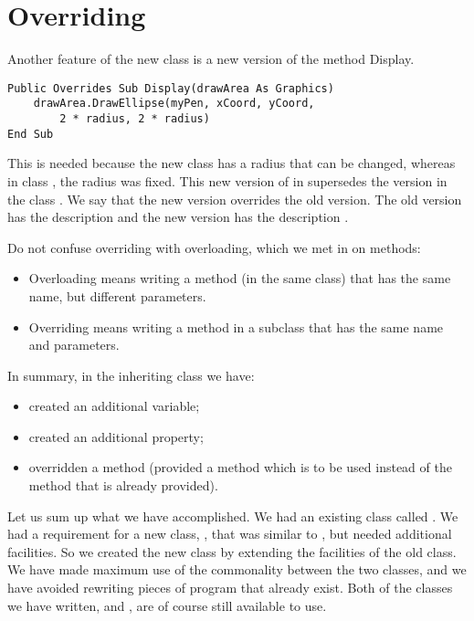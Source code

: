 	
	\section{Overriding}
		Another feature of the new class  is a new version of the method Display.
		\begin{lstlisting}
Public Overrides Sub Display(drawArea As Graphics)
	drawArea.DrawEllipse(myPen, xCoord, yCoord,
		2 * radius, 2 * radius)
End Sub
		\end{lstlisting}
		This is needed because the new class has a radius that can be changed, whereas in class , the radius was fixed. This new version of  in  supersedes the version in the class . We say that the new version overrides the old version. The old version has the description  and the new version has the description .
		
		Do not confuse overriding with overloading, which we met in  on methods:
		\begin{itemize}
      \item Overloading means writing a method (in the same class) that has the same name, but different parameters.
      \item Overriding means writing a method in a subclass that has the same name and parameters.
		\end{itemize}
		In summary, in the inheriting class we have:
		\begin{itemize}
      \item created an additional variable;
      \item created an additional property;
      \item overridden a method (provided a method which is to be used instead of the method that is already provided).
		\end{itemize}
		Let us sum up what we have accomplished. We had an existing class called . We had a requirement for a new class, , that was similar to , but needed additional facilities. So we created the new class by extending the facilities of the old class. We have made maximum use of the commonality between the two classes, and we have avoided rewriting pieces of program that already exist. Both of the classes we have written,  and , are of course still available to use.
		
